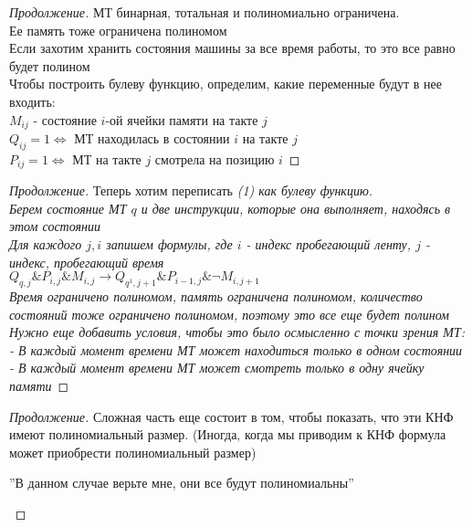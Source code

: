 \documentclass{beamer}
\theoremstyle{plain}
\theoremstyle{definition}
\begin{document}
\begin{frame}
	\begin{proof}[Продолжение]
	    МТ бинарная, тотальная и полиномиально ограничена. \\
	    Ее память тоже ограничена полиномом \\
	    Если захотим хранить состояния машины за все время работы, то это все равно будет полином \\
	    Чтобы построить булеву функцию, определим, какие переменные будут в нее входить: \\
	    $M_{ij}$ - состояние $i$-ой ячейки памяти на такте $j$ \\
	    $Q_{ij}=1 \Leftrightarrow$ МТ находилась в состоянии $i$ на такте $j$ \\
	    $P_{ij}=1 \Leftrightarrow$ МТ на такте $j$ смотрела на позицию $i$
	\end{proof}
\end{frame}

\begin{frame}
	\begin{proof}[Продолжение]
	    Теперь хотим переписать \itshape{(1)} \normalfont{} как булеву функцию. \\
	    Берем состояние МТ $q$ и две инструкции, которые она выполняет, находясь в этом состоянии \\
	    Для каждого $j,i$ запишем формулы, где $i$ - индекс пробегающий ленту, $j$ - индекс, пробегающий время \\
	    $Q_{q,j} \& P_{i,j} \& M_{i,j} \rightarrow Q_{q^1,j+1} \& P_{i-1,j} \& \neg M_{i,j+1}$ \\
	    Время ограничено полиномом, память ограничена полиномом, количество состояний тоже ограничено полиномом, поэтому это все еще будет полином \\
	    Нужно еще добавить условия, чтобы это было осмысленно с точки зрения МТ: \\
	    - В каждый момент времени МТ может находиться только в одном состоянии \\
	    - В каждый момент времени МТ может смотреть только в одну ячейку памяти
	\end{proof}
\end{frame}

\begin{frame}
	\begin{proof}[Продолжение]
	    Сложная часть еще состоит в том, чтобы показать, что эти КНФ имеют полиномиальный размер. (Иногда, когда мы приводим к КНФ формула может приобрести полиномиальный размер) \\
	    \begin{center}
	    	''В данном случае верьте мне, они все будут полиномиальны''
	    \end{center}
	\end{proof}
\end{frame}
\end{document}
